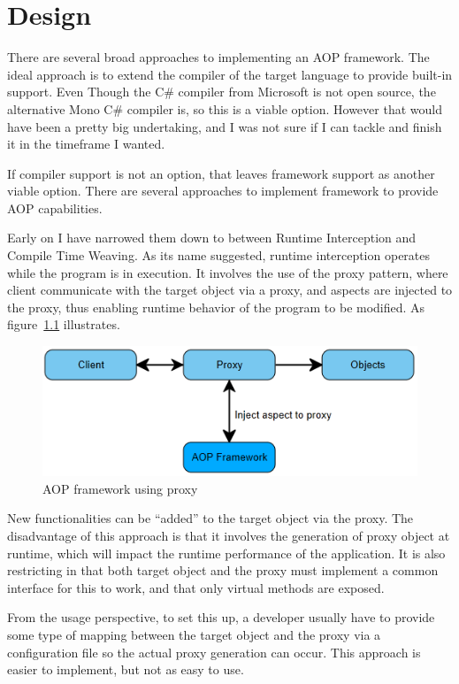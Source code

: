 \chapter{Design}

There are several broad approaches to implementing an AOP framework. The ideal approach is to extend the compiler of the target language to provide built-in support. Even Though the C\# compiler from Microsoft is not open source, the alternative Mono C\# compiler is, so this is a viable option. However that would have been a pretty big undertaking, and I was not sure if I can tackle and finish it in the timeframe I wanted.

If compiler support is not an option, that leaves framework support as another viable option. There are several approaches to implement framework to provide AOP capabilities.

Early on I have narrowed them down to between Runtime Interception and Compile Time Weaving. As its name suggested, runtime interception operates while the program is in execution. It involves the use of the proxy pattern, where client communicate with the target object via a proxy, and aspects are injected to the proxy, thus enabling runtime behavior of the program to be modified. As figure~\ref{proxy_model} illustrates.

\begin{figure}[here]
  \includegraphics[scale=1.0]{Proxy.PNG}
  \centering
  \caption{AOP framework using proxy\label{proxy_model}}
\end{figure}

New functionalities can be “added” to the target object via the proxy. The disadvantage of this approach is that it involves the generation of proxy object at runtime, which will impact the runtime performance of the application. It is also restricting in that both target object and the proxy must implement a common interface for this to work, and that only virtual methods are exposed.

From the usage perspective, to set this up, a developer usually have to provide some type of mapping between the target object and the proxy via a configuration file so the actual proxy generation can occur. This approach is easier to implement, but not as easy to use.

